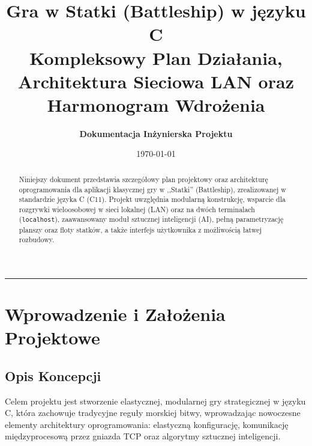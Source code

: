 \documentclass[11pt,a4paper]{article}
\title{
    \vspace{-1.5cm}
    \textbf{\huge Gra w Statki (Battleship) w języku C}\\[0.3cm]
    \large Kompleksowy Plan Działania, Architektura Sieciowa LAN oraz Harmonogram Wdrożenia
}
\author{\textbf{Dokumentacja Inżynierska Projektu}}
\date{\today}
\begin{document}
\maketitle
\thispagestyle{fancy}

\begin{abstract}
Niniejszy dokument przedstawia szczegółowy plan projektowy oraz architekturę oprogramowania dla aplikacji klasycznej gry w ,,Statki'' (Battleship), zrealizowanej w standardzie języka C (C11). Projekt uwzględnia modularną konstrukcję, wsparcie dla rozgrywki wieloosobowej w sieci lokalnej (LAN) oraz na dwóch terminalach (\texttt{localhost}), zaawansowany moduł sztucznej inteligencji (AI), pełną parametryzację planszy oraz floty statków, a także interfejs użytkownika z możliwością łatwej rozbudowy.
\end{abstract}

\tableofcontents
\vspace{0.5cm}
\hrule
\vspace{0.5cm}

\section{Wprowadzenie i Założenia Projektowe}
\subsection{Opis Koncepcji}
Celem projektu jest stworzenie elastycznej, modularnej gry strategicznej w języku C, która zachowuje tradycyjne reguły morskiej bitwy, wprowadzając nowoczesne elementy architektury oprogramowania: elastyczną konfigurację, komunikację międzyprocesową przez gniazda TCP oraz algorytmy sztucznej inteligencji.
\end{document}
